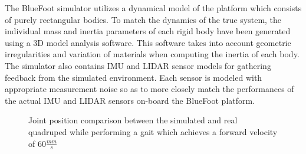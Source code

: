 		The BlueFoot simulator utilizes a dynamical model of the platform which consists of purely rectangular bodies. To match the dynamics of the true system, the individual mass and inertia parameters of each rigid body have been generated using a 3D model analysis software. This software takes into account geometric irregularities and variation of materials when computing the inertia of each body. The simulator also contains IMU and LIDAR sensor models for gathering feedback from the simulated environment. Each sensor is modeled with appropriate measurement noise so as to more closely match the performances of the actual IMU and LIDAR sensors on-board the BlueFoot platform.

			\begin{figure}[!h]
				\centering
				\caption{Joint position comparison between the simulated and real quadruped while performing a gait which achieves a forward velocity of $60\frac{mm}{s}$}
				\label{fig::sim_performance_comparison}
			\end{figure}

